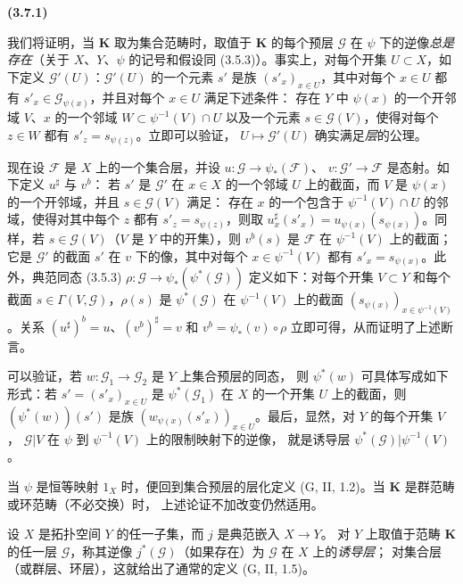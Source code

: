 \documentclass[UTF8,fontset=none,11pt,oneside,openany]{ctexbook}
\newenvironment{env}[1][]{%
  \par\medskip\noindent\textbf{(#1)}\ %
}{\par}
\let\EGAOriginalLabel\label
\renewcommand{\label}[1]{\phantomsection\EGAOriginalLabel{#1}}
\begin{document}
\begin{env}[3.7.1]
\label{0.3.7.1-fr}
我们将证明，当 $\mathbf{K}$ 取为集合范畴时，取值于 $\mathbf{K}$ 的每个预层
$\mathcal{G}$ 在 $\psi$ 下的逆像\emph{总是存在}（关于 $X$、$Y$、$\psi$
的记号和假设同 (3.5.3)）。事实上，对每个开集 $U\subset X$，如下定义
$\mathcal{G}'(U)$：$\mathcal{G}'(U)$ 的一个元素 $s'$ 是族
$(s'_x)_{x\in U}$，其中对每个 $x\in U$ 都有
$s'_x\in\mathcal{G}_{\psi(x)}$，并且对每个 $x\in U$ 满足下述条件：
存在 $Y$ 中 $\psi(x)$ 的一个开邻域 $V$、$x$ 的一个邻域
$W\subset\psi^{-1}(V)\cap U$ 以及一个元素 $s\in\mathcal{G}(V)$，使得对每个
$z\in W$ 都有 $s'_z=s_{\psi(z)}$。立即可以验证，
$U\mapsto\mathcal{G}'(U)$ 确实满足\emph{层}的公理。

现在设 $\mathcal{F}$ 是 $X$ 上的一个集合层，并设
$u:\mathcal{G}\to\psi_*(\mathcal{F})$、
$v:\mathcal{G}'\to\mathcal{F}$ 是态射。如下定义 $u^\sharp$ 与 $v^b$：
若 $s'$ 是 $\mathcal{G}'$ 在 $x\in X$ 的一个邻域 $U$ 上的截面，而
$V$ 是 $\psi(x)$ 的一个开邻域，并且 $s\in\mathcal{G}(V)$ 满足：
存在 $x$ 的一个包含于 $\psi^{-1}(V)\cap U$ 的邻域，使得对其中每个
$z$ 都有 $s'_z=s_{\psi(z)}$，则取
$u_x^\sharp(s'_x)=u_{\psi(x)}(s_{\psi(x)})$。同样，若
$s\in\mathcal{G}(V)$（$V$ 是 $Y$ 中的开集），则 $v^b(s)$ 是
$\mathcal{F}$ 在 $\psi^{-1}(V)$ 上的截面；它是 $\mathcal{G}'$ 的截面
$s'$ 在 $v$ 下的像，其中对每个 $x\in\psi^{-1}(V)$ 都有
$s'_x=s_{\psi(x)}$。此外，典范同态 (3.5.3)
$\rho:\mathcal{G}\to\psi_*(\psi^*(\mathcal{G}))$ 定义如下：对每个开集
$V\subset Y$ 和每个截面 $s\in\Gamma(V,\mathcal{G})$，$\rho(s)$ 是
$\psi^*(\mathcal{G})$ 在 $\psi^{-1}(V)$ 上的截面
$(s_{\psi(x)})_{x\in\psi^{-1}(V)}$。关系
$(u^\sharp)^b=u$、$(v^b)^\sharp=v$ 和
$v^b=\psi_*(v)\circ\rho$ 立即可得，从而证明了上述断言。

可以验证，若 $w:\mathcal{G}_1\to\mathcal{G}_2$ 是 $Y$ 上集合预层的同态，
则 $\psi^*(w)$ 可具体写成如下形式：若
$s'=(s'_x)_{x\in U}$ 是 $\psi^*(\mathcal{G}_1)$ 在 $X$ 的一个开集
$U$ 上的截面，则 $(\psi^*(w))(s')$ 是族
$(w_{\psi(x)}(s'_x))_{x\in U}$。最后，显然，对 $Y$ 的每个开集 $V$，
$\mathcal{G}|V$ 在 $\psi$ 到 $\psi^{-1}(V)$ 上的限制映射下的逆像，
就是诱导层 $\psi^*(\mathcal{G})|\psi^{-1}(V)$。

当 $\psi$ 是恒等映射 $1_X$ 时，便回到集合预层的层化定义
(G, II, 1.2)。当 $\mathbf{K}$ 是群范畴或环范畴（不必交换）时，
上述论证不加改变仍然适用。

设 $X$ 是拓扑空间 $Y$ 的任一子集，而 $j$ 是典范嵌入 $X\to Y$。
对 $Y$ 上取值于范畴 $\mathbf{K}$ 的任一层 $\mathcal{G}$，称其逆像
$j^*(\mathcal{G})$（如果存在）为 $\mathcal{G}$ 在 $X$ 上的\emph{诱导层}；
对集合层（或群层、环层），这就给出了通常的定义 (G, II, 1.5)。
\end{env}
\end{document}
